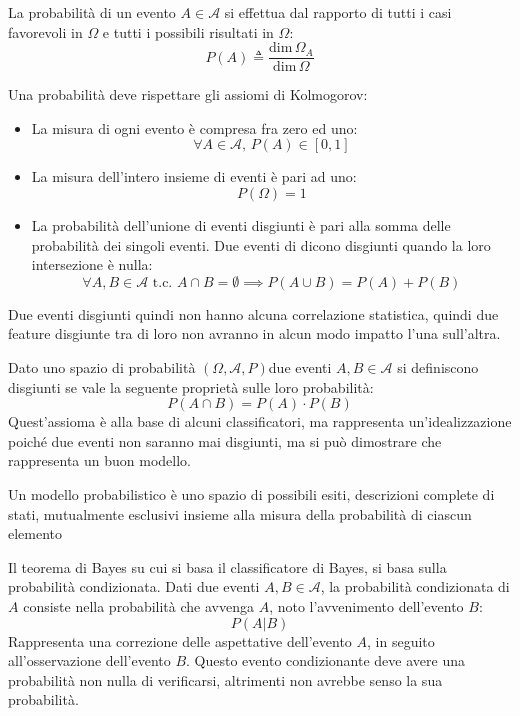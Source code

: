 \documentclass{article}
\numberwithin{equation}{subsection}
\begin{document}
La probabilità di un evento $A\in\mathscr{A}$ si effettua dal rapporto di tutti i casi favorevoli in $\Omega$ e tutti i possibili risultati in $\Omega$:
\begin{equation*}
    P(A)\triangleq\displaystyle\frac{\text{dim}\,\Omega_A}{\text{dim}\,\Omega}
\end{equation*}

Una probabilità deve rispettare gli assiomi di Kolmogorov:
\begin{itemize}
    \item La misura di ogni evento è compresa fra zero ed uno:
    \begin{equation*}
        \forall A\in\mathscr{A},\,P(A)\in[0,1]
    \end{equation*}
    \item La misura dell'intero insieme di eventi è pari ad uno:
    \begin{equation*}
        P(\Omega)=1
    \end{equation*}
    \item La probabilità dell'unione di eventi disgiunti è pari alla somma delle probabilità dei singoli eventi. Due eventi di dicono disgiunti quando la loro intersezione è nulla:
    \begin{equation*}
        \forall A, B\in\mathscr{A}\text{ t.c. }A\cap B=\emptyset\implies P(A\cup B)=P(A)+P(B)
    \end{equation*}
\end{itemize}
Due eventi disgiunti quindi non hanno alcuna correlazione statistica, quindi due feature disgiunte tra di loro non avranno in alcun modo impatto l'una sull'altra. 

Dato uno spazio di probabilità $(\Omega, \mathscr{A},P)$due eventi $A, B\in\mathscr{A}$ si definiscono disgiunti se 
vale la seguente proprietà sulle loro probabilità:
\begin{equation*}
    P(A\cap B)=P(A)\cdot P(B)
\end{equation*}
Quest'assioma è alla base di alcuni classificatori, ma rappresenta un'idealizzazione poiché due eventi non saranno mai disgiunti, ma si può dimostrare che rappresenta un buon modello. 


Un modello probabilistico è uno spazio di possibili esiti, descrizioni complete di stati, mutualmente esclusivi insieme alla misura della probabilità di ciascun elemento

Il teorema di Bayes su cui si basa il classificatore di Bayes, si basa sulla probabilità condizionata. Dati due eventi $A,B\in\mathscr{A}$, la probabilità condizionata di $A$ consiste nella probabilità che avvenga $A$, noto l'avvenimento dell'evento $B$: 
\begin{equation*}
    P(A|B)
\end{equation*}
Rappresenta una correzione delle aspettative dell'evento $A$, in seguito all'osservazione dell'evento $B$. Questo evento condizionante deve avere una probabilità non nulla di verificarsi, altrimenti non avrebbe senso la sua probabilità. 
\end{document}

